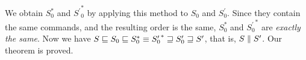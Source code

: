 We obtain \(S_0^*\) and \({S^\prime}_0^*\) by applying this method to \(S_0\) and
\(S^\prime_0\). Since they contain the same
commands, and the resulting order is the same,
\(S_0^*\) and
\({S^\prime_0}^*\) are \emph{exactly the same}. Now we have
\(S\sqsubseteq S_0\sqsubseteq S_0^*\equiv{S^\prime_0}^*\sqsupseteq S^\prime_0\sqsupseteq
S^\prime\), that is, \(S\parallel S^\prime\). Our theorem is proved.


